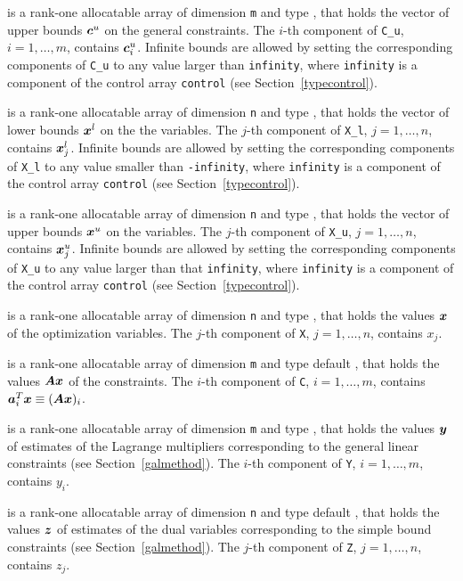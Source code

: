 \documentclass{galahad}
\begin{document}
\begin{description}
 is a rank-one allocatable array of dimension {\tt m} and type
\realdp, that holds the vector of upper bounds ${\bm{c}}^{u}$
on the general constraints. The $i$-th component of
{\tt C\_u}, $i = 1,  \ldots ,  m$, contains ${\bm{c}}_{i}^{u}$.
Infinite bounds are allowed by setting the corresponding
components of {\tt C\_u} to any value larger than {\tt infinity},
where {\tt infinity} is a component of the control array {\tt control}
(see Section~\ref{typecontrol}).

 is a rank-one allocatable array of dimension {\tt n} and type
\realdp, that holds
the vector of lower bounds ${\bm{x}}^{l}$ on the the variables.
The $j$-th component of {\tt X\_l}, $j = 1, \ldots , n$,
contains ${\bm{x}}_{j}^{l}$.
Infinite bounds are allowed by setting the corresponding
components of {\tt X\_l} to any value smaller than {\tt -infinity},
where {\tt infinity} is a component of the control array {\tt control}
(see Section~\ref{typecontrol}).

 is a rank-one allocatable array of dimension {\tt n} and type
\realdp, that holds
the vector of upper bounds ${\bm{x}}^{u}$ on the variables.
The $j$-th component of {\tt X\_u}, $j = 1, \ldots , n$,
contains ${\bm{x}}_{j}^{u}$.
Infinite bounds are allowed by setting the corresponding
components of {\tt X\_u} to any value larger than that {\tt infinity},
where {\tt infinity} is a component of the control array {\tt control}
(see Section~\ref{typecontrol}).

 is a rank-one allocatable array of dimension {\tt n} and type
\realdp,
that holds the values ${\bm{x}}$ of the optimization variables.
The $j$-th component of {\tt X}, $j = 1,  \ldots , n$, contains $x_{j}$.

 is a rank-one allocatable array of dimension {\tt m} and type default
\realdp, that holds
the values ${\bm{A}} {\bm{x}}$ of the constraints.
The $i$-th component of {\tt C}, $i = 1,  \ldots ,  m$, contains
${\bm{a}}_{i}^{T}{\bm{x}} \equiv ({\bm{A}} {\bm{x}})_{i}$.

 is a rank-one allocatable array of dimension {\tt m} and type
\realdp, that holds
the values ${\bm{y}}$ of estimates  of the Lagrange multipliers
corresponding to the general linear constraints (see Section~\ref{galmethod}).
The $i$-th component of {\tt Y}, $i = 1,  \ldots ,  m$, contains $y_{i}$.

 is a rank-one allocatable array of dimension {\tt n} and type default
\realdp, that holds
the values ${\bm{z}}$ of estimates  of the dual variables
corresponding to the simple bound constraints (see Section~\ref{galmethod}).
The $j$-th component of {\tt Z}, $j = 1,  \ldots ,  n$, contains $z_{j}$.

\end{description}
\end{document}
